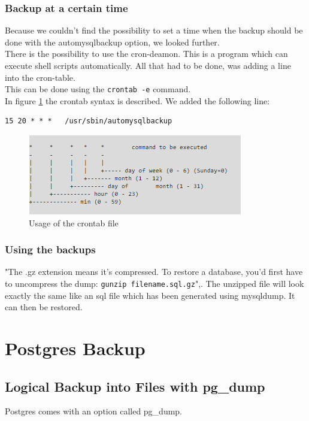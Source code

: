 \documentclass[10pt]{article}
\begin{document}
\subsubsection{Backup at a certain time}
Because we couldn't find the possibility to set a time when the backup should be done with the automysqlbackup option, we looked further. \\
There is the possibility to use the cron-deamon. This is a program which can execute shell scripts automatically.
All that had to be done, was adding a line into the cron-table. \\
This can be done using the \texttt{crontab -e} command. \\
In figure \ref{fig:crontab} the crontab syntax is described. We added the following line:
\begin{lstlisting}
15 20 * * *   /usr/sbin/automysqlbackup
\end{lstlisting}
\begin{figure}[!h]
	\begin{center}
		\includegraphics[width=1.0\linewidth]{pictures/crontab}
		\caption{Usage of the crontab file\cite{crontabref}}
		\label{fig:crontab}
	\end{center}
\end{figure}
\subsubsection{Using the backups}
"The .gz extension means it's compressed. To restore a database, you'd first have to uncompress the dump:
\texttt{gunzip filename.sql.gz}",\cite{uglywebpage}. The unzipped file will look exactly the same like an sql file which has been generated using mysqldump. It can then be restored.
\newpage
\section{Postgres Backup}
\subsection{Logical Backup into Files with pg\_dump}
Postgres comes with an option called pg\_dump. 
\end{document}
